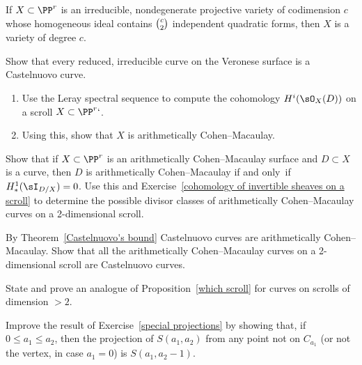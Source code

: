 \begin{exercise}\label{many quadrics}
If $X \subset \PP^r$ is an irreducible, nondegenerate projective variety
of codimension $c$ whose homogeneous ideal
contains $\tbinom{c}{2}$ independent quadratic forms, then $X$ is a
variety of degree $c$.
\end{exercise}

\begin{exercise}\label{Castelnuovo Veronese}
Show that every reduced, irreducible curve on the Veronese surface is
%
%
a Castelnuovo curve.
\end{exercise}

\begin{exercise}\label{cohomology of invertible sheaves on a scroll}
\begin{enumerate}
\item
Use the Leray spectral sequence
%
 to compute the cohomology
$H^{i}(\sO_{X}(D))$ on a scroll $X\subset \PP^r`$.
\item
Using this, show that $X$ is arithmetically Cohen--Macaulay.
%
\end{enumerate}
\end{exercise}

\begin{exercise}
Show that if $X\subset\PP^r$ is an arithmetically Cohen--Macaulay surface
and $D\subset X$ is a curve, then $D$ is arithmetically Cohen--Macaulay
if and only~if
$H^1_*(\sI_{D/X}) = 0$. Use this and Exercise~\ref{cohomology of
invertible sheaves on a scroll} to determine the
possible divisor classes of arithmetically Cohen--Macaulay curves on a
2-dimensional scroll.
\end{exercise}

\begin{exercise}\label{Castelnuovo scrolls}
By Theorem~\ref{Castelnuovo's bound}  Castelnuovo curves are
arithmetically Cohen--Macaulay.
Show that all the arithmetically Cohen--Macaulay curves on a 2-dimensional
scroll are
Castelnuovo curves.
%
\end{exercise}

\begin{exercise}
State and prove an analogue of Proposition~\ref{which scroll} for curves
on scrolls of dimension $>2$.
\end{exercise}

\begin{exercise}\label{general projections}
Improve the result of Exercise~\ref{special projections} by showing that,
if $0\leq a_1\leq a_2$, then
the projection of $S(a_1,a_2)$ from any point not on $C_{a_1}$ (or not
the vertex, in case $a_1=0$) is
$S(a_1, a_2-1)$.
\end{exercise}

